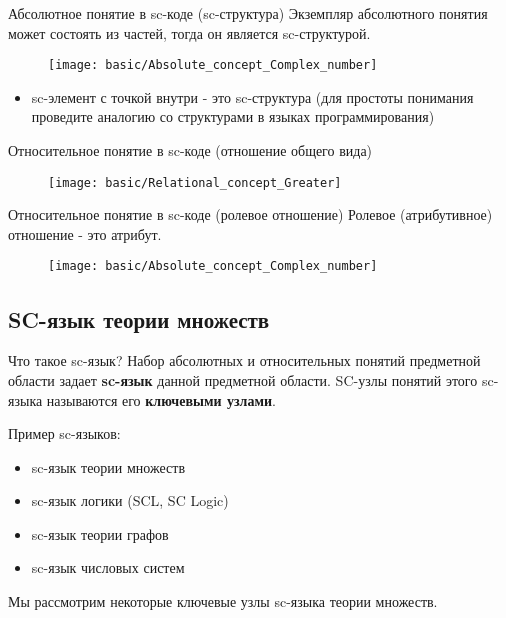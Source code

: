 \begin{frame}{Абсолютное понятие в sc-коде (sc-структура)}
  Экземпляр абсолютного понятия может состоять из частей, тогда он
  является sc-структурой.
  
  \begin{center}
    \begin{figure}
      \texttt{[image: basic/Absolute\_concept\_Complex\_number]}
    \end{figure}
  \end{center}

  \begin{itemize}
  \item sc-элемент с точкой внутри - это sc-структура (для простоты
    понимания проведите аналогию со структурами в языках
    программирования)
  \end{itemize}
\end{frame}

\begin{frame}{Относительное понятие в sc-коде (отношение общего вида)}
  \begin{center}
    \begin{figure}
      \texttt{[image: basic/Relational\_concept\_Greater]}
    \end{figure}
  \end{center}
\end{frame}

\begin{frame}{Относительное понятие в sc-коде (ролевое отношение)}
  Ролевое (атрибутивное) отношение - это атрибут.

  \begin{center}
    \begin{figure}
      \texttt{[image: basic/Absolute\_concept\_Complex\_number]}
    \end{figure}
  \end{center}
\end{frame}

\subsection{SC-язык теории множеств}

\begin{frame}{Что такое sc-язык?}
  Набор абсолютных и относительных понятий предметной области задает
  \textbf{sc-язык} данной предметной области. SC-узлы понятий этого
  sc-языка называются его \textbf{ключевыми узлами}.

  Пример sc-языков:
  \begin{itemize}
  \item sc-язык теории множеств
  \item sc-язык логики (SCL, SC Logic)
  \item sc-язык теории графов
  \item sc-язык числовых систем
  \end{itemize}

  Мы рассмотрим некоторые ключевые узлы sc-языка теории множеств.
\end{frame}

